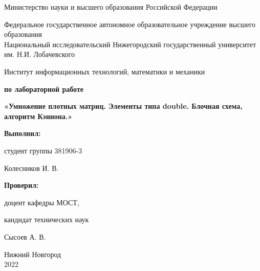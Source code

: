 \documentclass{report}
\begin{document}
\begin{titlepage}

\begin{center}
Министерство науки и высшего образования Российской Федерации
\end{center}

\begin{center}
Федеральное государственное автономное образовательное учреждение высшего образования \\
Национальный исследовательский Нижегородский государственный университет им. Н.И. Лобачевского
\end{center}

\begin{center}
Институт информационных технологий, математики и механики
\end{center}

\vspace{4em}

\begin{center}
\textbf{ по лабораторной работе} \\
\end{center}
\begin{center}
\textbf{\Large«Умножение плотных матриц. Элементы типа double. Блочная схема, алгоритм Кэннона.»} \\
\end{center}

\vspace{4em}

\newbox{\lbox}
\newlength{\maxl}
\setlength{\maxl}{\wd\lbox}
\hfill\parbox{7cm}{
\hspace*{5cm}\hspace*{-5cm}\textbf{Выполнил:} 

студент группы 381906-3 

Колесников И. В.


\hspace*{5cm}\hspace*{-5cm}\textbf{Проверил:}

доцент кафедры МОСТ, 

кандидат технических наук 

Сысоев А. В.
}
\vspace{\fill}

\begin{center} Нижний Новгород \\ 2022 \end{center}

\end{titlepage}
\end{document}
